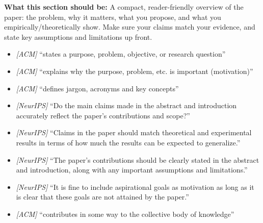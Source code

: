 \noindent\textbf{What this section should be:}
A compact, reader-friendly overview of the paper: the problem, why it matters, what you propose, and what you empirically/theoretically show. Make sure your claims match your evidence, and state key assumptions and limitations up front.
\begin{itemize}
  \item \textit{[ACM]} ``states a purpose, problem, objective, or research question''
  \item \textit{[ACM]} ``explains why the purpose, problem, etc. is important (motivation)''
  \item \textit{[ACM]} ``defines jargon, acronyms and key concepts''
  \item \textit{[NeurIPS]} ``Do the main claims made in the abstract and introduction accurately reflect the paper's contributions and scope?''
  \item \textit{[NeurIPS]} ``Claims in the paper should match theoretical and experimental results in terms of how much the results can be expected to generalize.''
  \item \textit{[NeurIPS]} ``The paper's contributions should be clearly stated in the abstract and introduction, along with any important assumptions and limitations.''
  \item \textit{[NeurIPS]} ``It is fine to include aspirational goals as motivation as long as it is clear that these goals are not attained by the paper.''
  \item \textit{[ACM]} ``contributes in some way to the collective body of knowledge''
\end{itemize}